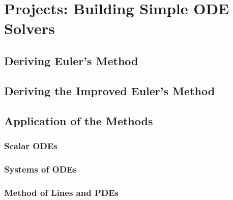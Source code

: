 \chapter{Projects: Building Simple ODE Solvers}
\label{chap:Projects}

\section{Deriving Euler's Method}

\section{Deriving the Improved Euler's Method}

\section{Application of the Methods}

\subsection{Scalar ODEs}

\subsection{Systems of ODEs}

\subsection{Method of Lines and PDEs}
